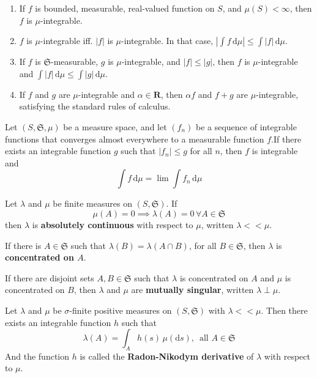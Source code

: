 \begin{enumerate}
	\item If $f$ is bounded, measurable, real-valued function on $S$, and $\mu(S) < \infty$, then $f$ is $\mu$-integrable.
	\item $f$ is $\mu$-integrable iff. $|f|$ is $\mu$-integrable. In that case, $| \int f \, \mathrm{d}\mu| \leq \int |f| \, \mathrm{d}\mu$.
	\item If $f$ is $\mathfrak{S}$-measurable, $g$ is $\mu$-integrable, and $|f| \leq |g|$, then $f$ is $\mu$-integrable and $\int |f| \, \mathrm{d}\mu \leq \int |g| \, \mathrm{d}\mu$.
	\item If $f$ and $g$ are $\mu$-integrable and $\alpha \in \textbf{R}$, then $\alpha f$ and $f + g$ are $\mu$-integrable, satisfying the standard rules of calculus.
\end{enumerate}

\begin{theorem}
	Let $(S, \mathfrak{S}, \mu)$ be a measure space, and let $(f_n)$ be a sequence of integrable functions that converges almost everywhere to a measurable function $f$.If there exists an integrable function $g$ such that $|f_n| \leq g$ for all $n$, then $f$ is integrable and
	\[
		\int f \, \mathrm{d}\mu = \lim \int f_n \, \mathrm{d}\mu
	\]
\end{theorem}

\begin{definition}
	Let $\lambda$ and $\mu$ be finite measures on $(S, \mathfrak{S})$. If
	\[
		\mu(A) = 0 \implies \lambda(A) = 0 \, \forall A \in \mathfrak{S}
	\]
	then $\lambda$ is \textbf{absolutely continuous} with respect to $\mu$, written $\lambda << \mu$. 

	If there is $A \in \mathfrak{S}$ such that $\lambda(B) = \lambda(A \cap B)$, for all $B \in \mathfrak{S}$, then $\lambda$ is \textbf{concentrated on $A$}.

	If there are disjoint sets $A, B \in \mathfrak{S}$ such that $\lambda$ is concentrated on $A$ and $\mu$ is concentrated on $B$, then $\lambda$ and $\mu$ are \textbf{mutually singular}, written $\lambda \perp \mu$.
\end{definition}

\begin{theorem}
	Let $\lambda$ and $\mu$ be $\sigma$-finite positive measures on $(S, \mathfrak{S})$ with $\lambda << \mu$. Then there exists an integrable function $h$ such that
	\[
		\lambda(A) = \int_A h(s) \, \mu(\mathrm{d}s), \, \text{ all } A \in \mathfrak{S}
	\]
	And the function $h$ is called the \textbf{Radon-Nikodym derivative} of $\lambda$ with respect to $\mu$.
\end{theorem}

